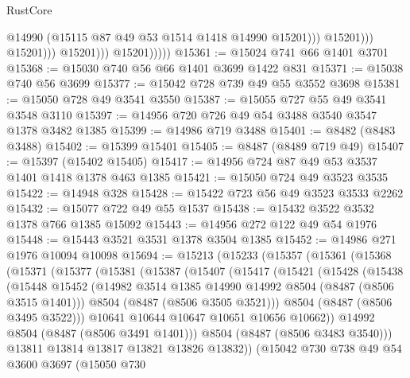 \begin{lexlean}{RustCore}
\begin{coremodule}
                                    @14990
                                    (@15115 @87 @49 @53 @1514 @1418 @14990 @15201)))
                                @15201)))
                          @15201)))
                    @15201)))
              @15201)))))
@15361 := @15024 @741 @66 @1401 @3701
@15368 := @15030 @740 @56 @66 @1401 @3699 @1422 @831
@15371 := @15038 @740 @56 @3699
@15377 := @15042 @728 @739 @49 @55 @3552 @3698
@15381 := @15050 @728 @49 @3541 @3550
@15387 := @15055 @727 @55 @49 @3541 @3548 @3110
@15397 := @14956 @720 @726 @49 @54 @3488 @3540 @3547 @1378 @3482 @1385
@15399 := @14986 @719 @3488
@15401 := @8482 (@8483 @3488)
@15402 := @15399 @15401
@15405 := @8487 (@8489 @719 @49)
@15407 := @15397 (@15402 @15405)
@15417 := @14956 @724 @87 @49 @53 @3537 @1401 @1418 @1378 @463 @1385
@15421 := @15050 @724 @49 @3523 @3535
@15422 := @14948 @328
@15428 := @15422 @723 @56 @49 @3523 @3533 @2262
@15432 := @15077 @722 @49 @55 @1537
@15438 := @15432 @3522 @3532 @1378 @766 @1385 @15092
@15443 := @14956 @272 @122 @49 @54 @1976
@15448 := @15443 @3521 @3531 @1378 @3504 @1385
@15452 := @14986 @271 @1976 @10094 @10098
@15694 := @15213
    (@15233
      (@15357
        (@15361
          (@15368
            (@15371
              (@15377
                (@15381
                  (@15387
                    (@15407
                      (@15417
                        (@15421
                          (@15428
                            (@15438
                              (@15448
                                @15452
                                (@14982 @3514 @1385 @14990 @14992 @8504 (@8487 (@8506 @3515 @1401)))
                                @8504
                                (@8487 (@8506 @3505 @3521)))
                              @8504
                              (@8487 (@8506 @3495 @3522)))
                            @10641
                            @10644
                            @10647
                            @10651
                            @10656
                            @10662))
                        @14992
                        @8504
                        (@8487 (@8506 @3491 @1401)))
                      @8504
                      (@8487 (@8506 @3483 @3540)))
                    @13811
                    @13814
                    @13817
                    @13821
                    @13826
                    @13832))
                (@15042
                  @730
                  @738
                  @49
                  @54
                  @3600
                  @3697
                  (@15050
                    @730

\end{coremodule}
\end{lexlean}
